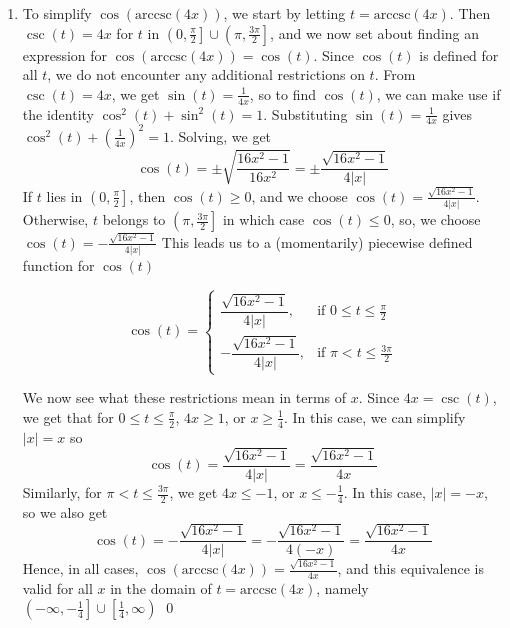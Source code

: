 \documentclass[12pt]{ximera}
\begin{document}
\begin{example}
\begin{enumerate}
\begin{enumerate}
\item To simplify $\cos(\mbox{arccsc}(4x))$, we start by letting $t = \mbox{arccsc}(4x)$.   Then $\csc(t) = 4x$ for $t$ in $\left(0, \frac{\pi}{2} \right] \cup \left(\pi, \frac{3\pi}{2} \right]$, and we now set about finding an expression for  $\cos(\mbox{arccsc}(4x)) = \cos(t)$.  Since $\cos(t)$ is defined for all $t$, we do not encounter any additional restrictions on $t$.  From $\csc(t) = 4x$, we get $\sin(t) = \frac{1}{4x}$, so to find $\cos(t)$, we can make use if the identity $\cos^{2}(t) + \sin^{2}(t) = 1$.  Substituting $\sin(t) = \frac{1}{4x}$  gives $\cos^{2}(t) + \left(\frac{1}{4x}\right)^2 = 1$.  Solving, we get \[\cos(t) = \pm \sqrt{\frac{16x^2-1}{16x^2}} = \pm \frac{\sqrt{16x^2-1}}{4|x|}\]  If $t$ lies in $\left(0, \frac{\pi}{2} \right]$, then $\cos(t) \geq 0$, and we choose  $\cos(t) = \frac{\sqrt{16x^2-1}}{4|x|}$. Otherwise, $t$ belongs to $\left( \pi, \frac{3\pi}{2} \right]$ in which case $\cos(t) \leq 0$, so, we choose $\cos(t) = -\frac{\sqrt{16x^2-1}}{4|x|}$ This leads us to a (momentarily) piecewise defined function for $\cos(t)$

\[ \cos(t) = \left\{ \begin{array}{rr} \dfrac{\sqrt{16x^2-1}}{4|x|}, & \text{if $0 \leq t \leq \frac{\pi}{2}$} \\ [5pt]  -\dfrac{\sqrt{16x^2-1}}{4|x|}, & \text{if $\pi < t \leq \frac{3\pi}{2}$}  \end{array}\right. \]

We now see what these restrictions mean in terms of $x$.  Since $4x = \csc(t)$, we get that for $0 \leq t \leq \frac{\pi}{2}$, $4x \geq 1$, or $x \geq \frac{1}{4}$.  In this case, we can simplify $|x| = x$ so \[\cos(t) = \frac{\sqrt{16x^2-1}}{4|x|} = \frac{\sqrt{16x^2-1}}{4x}\]  Similarly, for $\pi < t \leq \frac{3\pi}{2}$, we get $4x \leq -1$, or $x \leq -\frac{1}{4}$.  In this case, $|x| = -x$, so we also get \[\cos(t) = -\frac{\sqrt{16x^2-1}}{4|x|}  = -\frac{\sqrt{16x^2-1}}{4(-x)} =  \frac{\sqrt{16x^2-1}}{4x}\]  Hence, in all cases, $\cos(\mbox{arccsc}(4x)) =  \frac{\sqrt{16x^2-1}}{4x}$, and this equivalence is valid for all $x$ in the domain of $t = \mbox{arccsc}(4x)$, namely $\left(-\infty, -\frac{1}{4}\right] \cup \left[ \frac{1}{4}, \infty \right)$  \qed

\end{enumerate}

\end{enumerate}

\end{example}
\end{document}
